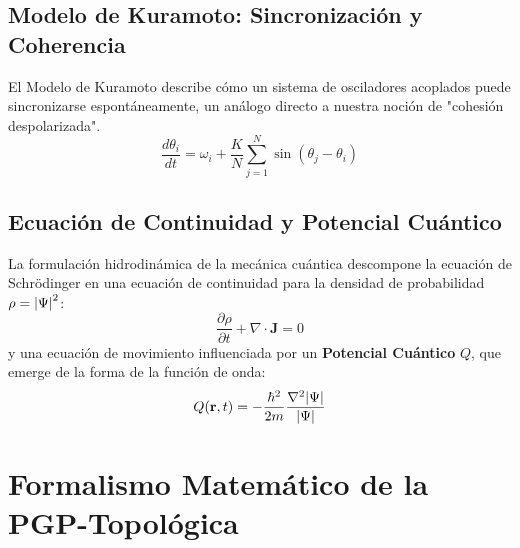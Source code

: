 \documentclass{book} %
\begin{document}
\section{Modelo de Kuramoto: Sincronización y Coherencia}
El Modelo de Kuramoto describe cómo un sistema de osciladores acoplados puede sincronizarse espontáneamente, un análogo directo a nuestra noción de "cohesión despolarizada".
\begin{equation}
    \frac{d\theta_i}{dt} = \omega_i + \frac{K}{N} \sum_{j=1}^{N} \sin(\theta_j - \theta_i)
    \label{eq:kuramoto_main}
\end{equation}

\section{Ecuación de Continuidad y Potencial Cuántico}
La formulación hidrodinámica de la mecánica cuántica descompone la ecuación de Schrödinger en una ecuación de continuidad para la densidad de probabilidad $\rho = \abs{\Psi}^2$:
\begin{equation}
    \frac{\partial \rho}{\partial t} + \nabla \cdot \mathbf{J} = 0
    \label{eq:continuity_quantum}
\end{equation}
y una ecuación de movimiento influenciada por un \textbf{Potencial Cuántico} $Q$, que emerge de la forma de la función de onda:
\begin{equation}
    Q(\mathbf{r}, t) = -\frac{\hbar^2}{2m} \frac{\nabla^2 \abs{\Psi}}{\abs{\Psi}}
    \label{eq:quantum_potential}
\end{equation}

\chapter{Formalismo Matemático de la PGP-Topológica}
\end{document}
